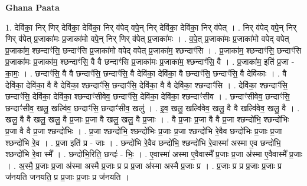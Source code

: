 \documentclass[17pt]{extarticle}
\begin{document}
\textbf{Ghana Paata } \newline

1. देवि॑का॒ निर् णिर् देवि॑का॒ देवि॑का॒ निर् व॑पेद् वपे॒न् निर् देवि॑का॒ देवि॑का॒ निर् व॑पेत् । . निर् व॑पेद् वपे॒न् निर् णिर् व॑पेत् प्र॒जाका॑मः प्र॒जाका॑मो वपे॒न् निर् णिर् व॑पेत् प्र॒जाका॑मः । . व॒पे॒त् प्र॒जाका॑मः प्र॒जाका॑मो वपेद् वपेत् प्र॒जाका॑म॒ श्छन्दाꣳ॑सि॒ छन्दाꣳ॑सि प्र॒जाका॑मो वपेद् वपेत् प्र॒जाका॑म॒ श्छन्दाꣳ॑सि । . प्र॒जाका॑म॒ श्छन्दाꣳ॑सि॒ छन्दाꣳ॑सि प्र॒जाका॑मः प्र॒जाका॑म॒ श्छन्दाꣳ॑सि॒ वै वै छन्दाꣳ॑सि प्र॒जाका॑मः प्र॒जाका॑म॒ श्छन्दाꣳ॑सि॒ वै । . प्र॒जाका॑म॒ इति॑ प्र॒जा - का॒मः॒ । . छन्दाꣳ॑सि॒ वै वै छन्दाꣳ॑सि॒ छन्दाꣳ॑सि॒ वै देवि॑का॒ देवि॑का॒ वै छन्दाꣳ॑सि॒ छन्दाꣳ॑सि॒ वै देवि॑काः । . वै देवि॑का॒ देवि॑का॒ वै वै देवि॑का॒ श्छन्दाꣳ॑सि॒ छन्दाꣳ॑सि॒ देवि॑का॒ वै वै देवि॑का॒ श्छन्दाꣳ॑सि । . देवि॑का॒ श्छन्दाꣳ॑सि॒ छन्दाꣳ॑सि॒ देवि॑का॒ देवि॑का॒ श्छन्दाꣳ॑सीवेव॒ छन्दाꣳ॑सि॒ देवि॑का॒ देवि॑का॒ श्छन्दाꣳ॑सीव । . छन्दाꣳ॑सीवेव॒ छन्दाꣳ॑सि॒ छन्दाꣳ॑सीव॒ खलु॒ खल्वि॑व॒ छन्दाꣳ॑सि॒ छन्दाꣳ॑सीव॒ खलु॑ । . इ॒व॒ खलु॒ खल्वि॑वेव॒ खलु॒ वै वै खल्वि॑वेव॒ खलु॒ वै । . खलु॒ वै वै खलु॒ खलु॒ वै प्र॒जाः प्र॒जा वै खलु॒ खलु॒ वै प्र॒जाः । . वै प्र॒जाः प्र॒जा वै वै प्र॒जा श्छन्दो॑भि॒ श्छन्दो॑भिः प्र॒जा वै वै प्र॒जा श्छन्दो॑भिः । . प्र॒जा श्छन्दो॑भि॒ श्छन्दो॑भिः प्र॒जाः प्र॒जा श्छन्दो॑भि रे॒वैव छन्दो॑भिः प्र॒जाः प्र॒जा श्छन्दो॑भि रे॒व । . प्र॒जा इति॑ प्र - जाः । . छन्दो॑भि रे॒वैव छन्दो॑भि॒ श्छन्दो॑भि रे॒वास्मा॑ अस्मा ए॒व छन्दो॑भि॒ श्छन्दो॑भि रे॒वा स्मै᳚ । . छन्दो॑भि॒रिति॒ छन्दः॑ - भिः॒ । . ए॒वास्मा॑ अस्मा ए॒वैवास्मै᳚ प्र॒जाः प्र॒जा अ॑स्मा ए॒वैवास्मै᳚ प्र॒जाः । . अ॒स्मै॒ प्र॒जाः प्र॒जा अ॑स्मा अस्मै प्र॒जाः प्र प्र प्र॒जा अ॑स्मा अस्मै प्र॒जाः प्र । . प्र॒जाः प्र प्र प्र॒जाः प्र॒जाः प्र ज॑नयति जनयति॒ प्र प्र॒जाः प्र॒जाः प्र ज॑नयति । \newline
\end{document}

